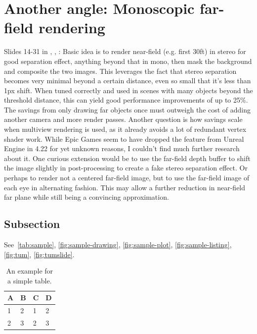 \section{Another angle: Monoscopic far-field rendering}
Slides 14-31 in \cite{DiDonato.01.03.2017}, \cite{EpicGamesInc..2016}, \cite{FacebookTechnologiesLLC..2016}: Basic idea is to render near-field (e.g. first 30ft) in stereo for good separation effect, anything beyond that in mono, then mask the background and composite the two images. This leverages the fact that stereo separation becomes very minimal beyond a certain distance, even so small that it's less than 1px shift. When tuned correctly and used in scenes with many objects beyond the threshold distance, this can yield good performance improvements of up to 25\%. The savings from only drawing far objects once must outweigh the cost of adding another camera and more render passes. 
Another question is how savings scale when multiview rendering is used, as it already avoids a lot of redundant vertex shader work. 
While Epic Games seem to have dropped the feature from Unreal Engine in 4.22 for yet unknown reasons, I couldn't find much further research about it. 
One curious extension would be to use the far-field depth buffer to shift the image slightly in post-processing to create a fake stereo separation effect. Or perhaps to render not a centered far-field image, but to use the far-field image of each eye in alternating fashion. This may allow a further reduction in near-field far plane while still being a convincing approximation. 

\iffalse
\subsection{Subsection}

See~\autoref{tab:sample}, \autoref{fig:sample-drawing}, \autoref{fig:sample-plot}, \autoref{fig:sample-listing}, \autoref{fig:tum}, \autoref{fig:tumslide}.

\begin{table}[htpb]
  \caption[Example table]{An example for a simple table.}\label{tab:sample}
  \centering
  \begin{tabular}{l l l l}
    \toprule
      A & B & C & D \\
    \midrule
      1 & 2 & 1 & 2 \\
      2 & 3 & 2 & 3 \\
    \bottomrule
  \end{tabular}
\end{table}

